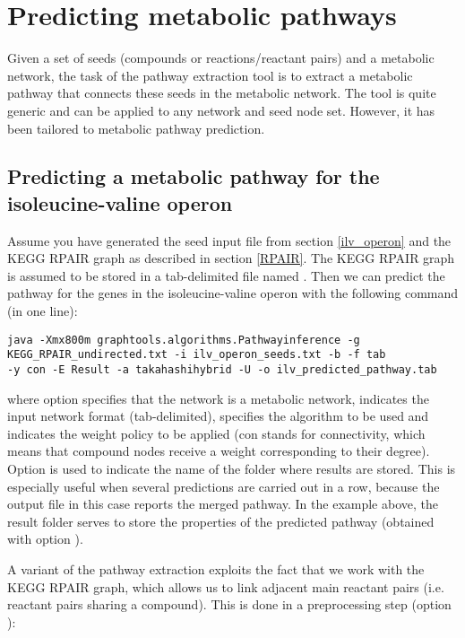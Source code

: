 \section{Predicting metabolic pathways}

Given a set of seeds (compounds or reactions/reactant pairs) and a metabolic
network, the task of the pathway extraction tool is to extract a metabolic
pathway that connects these seeds in the metabolic network. The tool is quite generic and can be
applied to any network and seed node set. However, it has been tailored to
metabolic pathway prediction.

\subsection{Predicting a metabolic pathway for the isoleucine-valine operon}

Assume you have generated the seed input file from section \ref{ilv_operon} and
the KEGG RPAIR graph as described in section \ref{RPAIR}. The KEGG RPAIR graph
is assumed to be stored in a tab-delimited file named
. Then we can predict the pathway for the
genes in the isoleucine-valine operon with the following command (in one line):

\begin{lstlisting}
java -Xmx800m graphtools.algorithms.Pathwayinference -g
KEGG_RPAIR_undirected.txt -i ilv_operon_seeds.txt -b -f tab  
-y con -E Result -a takahashihybrid -U -o ilv_predicted_pathway.tab
\end{lstlisting}

where option  specifies that the network is a metabolic
network,  indicates the input network format (tab-delimited),
 specifies the algorithm to be used and  indicates the
weight policy to be applied (con stands for connectivity, which means that
compound nodes receive a weight corresponding to their degree). 
Option  is used to indicate the name of the folder where results are
stored. This is especially useful when several predictions are carried out in a
row, because the output file in this case reports the merged pathway. In the
example above, the result folder serves to store the properties of
the predicted pathway (obtained with option ).

A variant of the pathway extraction exploits the fact that we work with the
KEGG RPAIR graph, which allows us to link adjacent main reactant pairs (i.e.
reactant pairs sharing a compound). This is done in a preprocessing step
(option ):

